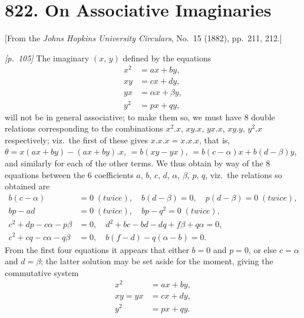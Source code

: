 \documentclass[11pt,a4paper]{book}
\begin{document}
\section*{822. On Associative Imaginaries}

\begin{center}
\small[From the \textit{Johns Hopkins University Circulars}, No.~15 (1882), pp.~211, 212.]
\end{center}

\bigskip

\noindent\textit{[p.~105]} The imaginary $(x,\,y)$ defined by the equations
\begin{align*}
x^2 &= ax + by,\\
xy &= cx + dy,\\
yx &= \alpha x + \beta y,\\
y^2 &= px + qy,
\end{align*}
will not be in general associative; to make them so, we must have 8 double relations corresponding to the combinations $x^2.x$, $xy.x$, $yx.x$, $xy.y$, $y^2.x$ respectively; viz.\ the first of these gives $x.x.x = x.x.x$, that is, $\theta = x(ax + by) - (ax + by).x$, $= b(xy - yx)$, $= b(c - \alpha) x + b(d - \beta) y$, and similarly for each of the other terms. We thus obtain by way of the 8 equations between the 6 coefficients $a$, $b$, $c$, $d$, $\alpha$, $\beta$, $p$, $q$, viz.\ the relations so obtained are
\begin{align*}
b(c - \alpha) &= 0\;(twice),\quad b(d - \beta) = 0,\quad p(d - \beta) = 0\;(twice),\\
bp - ad &= 0\;(twice),\quad bp - q^2 = 0\;(twice),\\
c^2 + dp - c\alpha - p\beta &= 0,\quad d^2 + bc - bd - dq + f\beta + q\alpha = 0,\\
c^2 + cq - c\alpha - q\beta &= 0,\quad b(f - d) - q(\alpha - b) = 0.
\end{align*}
From the first four equations it appears that either $b = 0$ and $p = 0$, or else $c = \alpha$ and $d = \beta$; the latter solution may be set aside for the moment, giving the commutative system
\begin{align*}
x^2 &= ax + by,\\
xy = yx &= cx + dy,\\
y^2 &= px + qy.
\end{align*}
\end{document}
